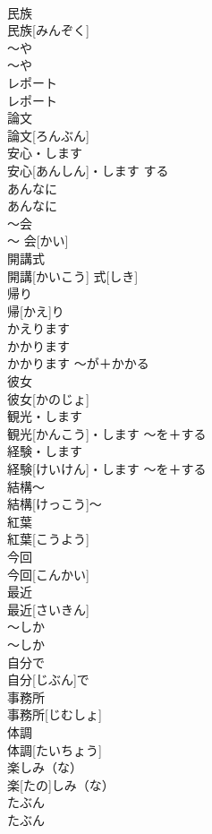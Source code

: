 \documentclass[8pt]{extreport}
\begin{document}
\begin{CJK}{UTF8}{min}
\\	民族	
\\	民族[みんぞく]		
\\	〜や	
\\	〜や		
\\	レポート	
\\	レポート		
\\	論文	
\\	論文[ろんぶん]		
\\	安心・します	
\\	安心[あんしん]・します	する	
\\	あんなに	
\\	あんなに		
\\	〜会	
\\	〜 会[かい]		
\\	開講式	
\\	開講[かいこう] 式[しき]		
\\	帰り	
\\	帰[かえ]り	
\\	かえります 
\\	かかります	
\\	かかります	〜が＋かかる	
\\	彼女	
\\	彼女[かのじょ]		
\\	観光・します	
\\	観光[かんこう]・します	〜を＋する	
\\	経験・します	
\\	経験[けいけん]・します	〜を＋する	
\\	結構〜	
\\	結構[けっこう]〜		
\\	紅葉	
\\	紅葉[こうよう]		
\\	今回	
\\	今回[こんかい]		
\\	最近	
\\	最近[さいきん]		
\\	〜しか	
\\	〜しか		
\\	自分で	
\\	自分[じぶん]で		
\\	事務所	
\\	事務所[じむしょ]		
\\	体調	
\\	体調[たいちょう]		
\\	楽しみ（な）	
\\	楽[たの]しみ（な）		
\\	たぶん	
\\	たぶん		

\end{CJK}
\end{document}
